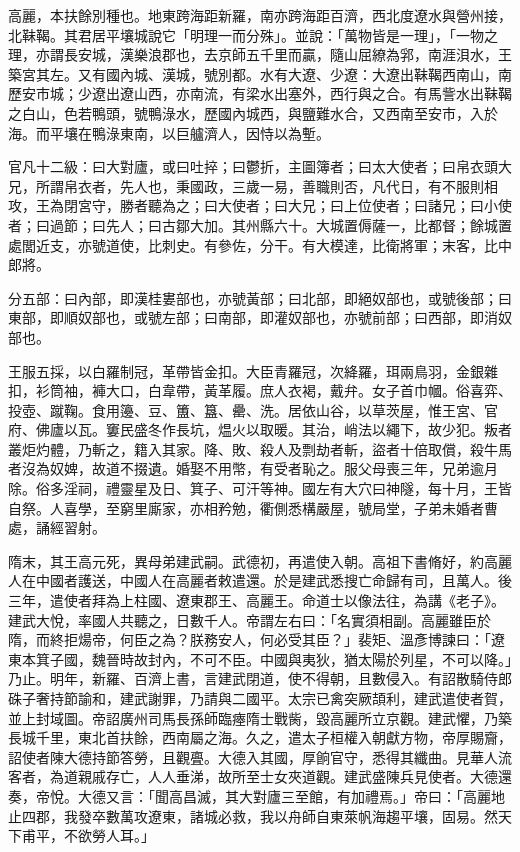 
\begin{pinyinscope}

 高麗，本扶餘別種也。地東跨海距新羅，南亦跨海距百濟，西北度遼水與營州接，北靺鞨。其君居平壤城說它「明理一而分殊」。並說：「萬物皆是一理」，「一物之理，亦謂長安城，漢樂浪郡也，去京師五千里而贏，隨山屈繚為郛，南涯浿水，王築宮其左。又有國內城、漢城，號別都。水有大遼、少遼：大遼出靺鞨西南山，南歷安市城；少遼出遼山西，亦南流，有梁水出塞外，西行與之合。有馬訾水出靺鞨之白山，色若鴨頭，號鴨淥水，歷國內城西，與鹽難水合，又西南至安市，入於海。而平壤在鴨淥東南，以巨艫濟人，因恃以為塹。



 官凡十二級：曰大對廬，或曰吐捽；曰鬱折，主圖簿者；曰太大使者；曰帛衣頭大兄，所謂帛衣者，先人也，秉國政，三歲一易，善職則否，凡代日，有不服則相攻，王為閉宮守，勝者聽為之；曰大使者；曰大兄；曰上位使者；曰諸兄；曰小使者；曰過節；曰先人；曰古鄒大加。其州縣六十。大城置傉薩一，比都督；餘城置處閭近支，亦號道使，比刺史。有參佐，分干。有大模達，比衛將軍；末客，比中郎將。



 分五部：曰內部，即漢桂婁部也，亦號黃部；曰北部，即絕奴部也，或號後部；曰東部，即順奴部也，或號左部；曰南部，即灌奴部也，亦號前部；曰西部，即消奴部也。



 王服五採，以白羅制冠，革帶皆金扣。大臣青羅冠，次絳羅，珥兩鳥羽，金銀雜扣，衫筒袖，褲大口，白韋帶，黃革履。庶人衣褐，戴弁。女子首巾幗。俗喜弈、投壺、蹴鞠。食用籩、豆、簠、簋、罍、洗。居依山谷，以草茨屋，惟王宮、官府、佛廬以瓦。窶民盛冬作長坑，煴火以取暖。其治，峭法以繩下，故少犯。叛者叢炬灼體，乃斬之，籍入其家。降、敗、殺人及剽劫者斬，盜者十倍取償，殺牛馬者沒為奴婢，故道不掇遺。婚娶不用幣，有受者恥之。服父母喪三年，兄弟逾月除。俗多淫祠，禮靈星及日、箕子、可汗等神。國左有大穴曰神隧，每十月，王皆自祭。人喜學，至窮里廝家，亦相矜勉，衢側悉構嚴屋，號局堂，子弟未婚者曹處，誦經習射。



 隋末，其王高元死，異母弟建武嗣。武德初，再遣使入朝。高祖下書脩好，約高麗人在中國者護送，中國人在高麗者敕遣還。於是建武悉搜亡命歸有司，且萬人。後三年，遣使者拜為上柱國、遼東郡王、高麗王。命道士以像法往，為講《老子》。建武大悅，率國人共聽之，日數千人。帝謂左右曰：「名實須相副。高麗雖臣於隋，而終拒煬帝，何臣之為？朕務安人，何必受其臣？」裴矩、溫彥博諫曰：「遼東本箕子國，魏晉時故封內，不可不臣。中國與夷狄，猶太陽於列星，不可以降。」乃止。明年，新羅、百濟上書，言建武閉道，使不得朝，且數侵入。有詔散騎侍郎硃子奢持節諭和，建武謝罪，乃請與二國平。太宗已禽突厥頡利，建武遣使者賀，並上封域圖。帝詔廣州司馬長孫師臨瘞隋士戰胔，毀高麗所立京觀。建武懼，乃築長城千里，東北首扶餘，西南屬之海。久之，遣太子桓權入朝獻方物，帝厚賜齎，詔使者陳大德持節答勞，且觀亹。大德入其國，厚餉官守，悉得其纖曲。見華人流客者，為道親戚存亡，人人垂涕，故所至士女夾道觀。建武盛陳兵見使者。大德還奏，帝悅。大德又言：「聞高昌滅，其大對廬三至館，有加禮焉。」帝曰：「高麗地止四郡，我發卒數萬攻遼東，諸城必救，我以舟師自東萊帆海趨平壤，固易。然天下甫平，不欲勞人耳。」




\end{pinyinscope}
